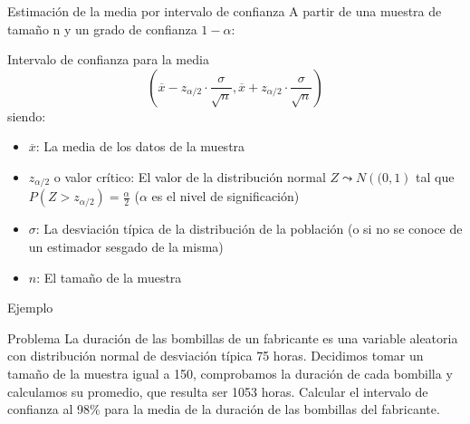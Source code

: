 \documentclass[11pt,handout]{beamer}
\begin{document}
\begin{frame}
{Estimación de la media por intervalo de confianza}
A partir de una muestra de tamaño n y un grado de confianza $1-\alpha$: 
\begin{block}{Intervalo de confianza para la media}
$$ \left( \overline{x} - z_{\alpha / 2}\cdot \frac{\sigma}{\sqrt{n}} ,  \overline{x} + z_{\alpha / 2}\cdot \frac{\sigma}{\sqrt{n}}
\right)$$
siendo: \begin{itemize}
\item $\overline{x}$: La media de los datos de la muestra
\item $z_{\alpha / 2}$ o valor crítico: El valor de la distribución normal  $Z\leadsto N\left((0,1\right)$ tal que $P(Z>z_{\alpha / 2})=\frac{\alpha}{2}$ ($\alpha$ es el nivel de significación)
\item $\sigma$: La desviación típica de la distribución de la población (o si no se conoce de un estimador sesgado de la misma)
\item $n$: El tamaño de la muestra
\end{itemize}
\end{block}
\pause

\end{frame}

\begin{frame}
{Ejemplo}
\begin{block}{Problema} La duración de las bombillas de un fabricante es una variable aleatoria con distribución
normal de desviación típica 75 horas. Decidimos tomar un tamaño de la muestra igual a 150, comprobamos la duración de cada
bombilla y calculamos su promedio, que resulta ser 1053 horas. Calcular el intervalo de confianza al 98\%
para la media de la duración de las bombillas del fabricante.
\end{block}
\end{frame}
\end{document}
